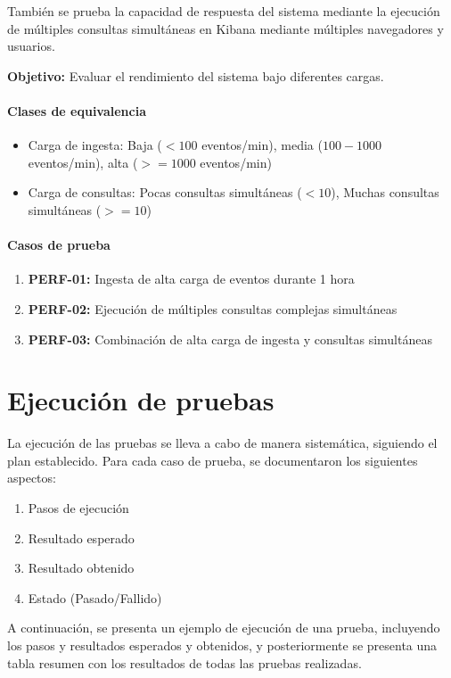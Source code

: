 También se prueba la capacidad de respuesta del sistema mediante la ejecución
de múltiples consultas simultáneas en Kibana mediante múltiples navegadores y
usuarios.

\textbf{Objetivo:} Evaluar el rendimiento del sistema bajo diferentes cargas.

\paragraph{Clases de equivalencia}

\begin{itemize}
    \item Carga de ingesta: Baja ($<100$ eventos/min), media ($100-1000$ eventos/min),
    	alta ($>=1000$ eventos/min)
    \item Carga de consultas: Pocas consultas simultáneas ($<10$), Muchas
    consultas simultáneas ($>=10$)
\end{itemize}

\paragraph{Casos de prueba}
\begin{enumerate}
    \item \textbf{PERF-01:} Ingesta de alta carga de eventos durante 1 hora
    \item \textbf{PERF-02:} Ejecución de múltiples consultas complejas simultáneas
    \item \textbf{PERF-03:} Combinación de alta carga de ingesta y consultas simultáneas
\end{enumerate}


\newpage{}
\section{Ejecución de pruebas}
La ejecución de las pruebas se lleva a cabo de manera sistemática, siguiendo
el plan establecido. Para cada caso de prueba, se documentaron los siguientes
aspectos:

\begin{enumerate}
    \item Pasos de ejecución
    \item Resultado esperado
    \item Resultado obtenido
    \item Estado (Pasado/Fallido)
\end{enumerate}

A continuación, se presenta un ejemplo de ejecución de una prueba, incluyendo
los pasos y resultados esperados y obtenidos, y posteriormente se presenta una
tabla resumen con los resultados de todas las pruebas realizadas.


